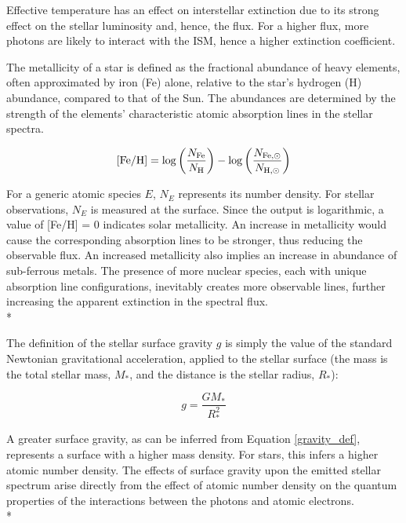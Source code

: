 \documentclass[12pt, a4paper]{report}
\begin{document}
Effective temperature has an effect on interstellar extinction due to its strong effect on the stellar luminosity and, hence, the flux. For a higher flux, more photons are likely to interact with the ISM, hence a higher extinction coefficient.

The metallicity of a star is defined as the fractional abundance of heavy elements, often approximated by iron (Fe) alone, relative to the star's hydrogen (H) abundance, compared to that of the Sun. The abundances are determined by the strength of the elements' characteristic atomic absorption lines in the stellar spectra.

\begin{equation}
\textnormal{[Fe/H]} = \log\left(\frac{N_{\textnormal{Fe}}}{N_{\textnormal{H}}}\right) - \log\left(\frac{N_{\textnormal{Fe},\odot}}{N_{\textnormal{H},\odot}}\right)
\label{FeH_def}
\end{equation}

For a generic atomic species $E$, $N_{E}$ represents its number density. For stellar observations, $N_{E}$ is measured at the surface. Since the output is logarithmic, a value of [Fe/H] = 0 indicates solar metallicity. An increase in metallicity would cause the corresponding absorption lines to be stronger, thus reducing the observable flux. An increased metallicity also implies an increase in abundance of sub-ferrous metals. The presence of more nuclear species, each with unique absorption line configurations, inevitably creates more observable lines, further increasing the apparent extinction in the spectral flux.\\*

The definition of the stellar surface gravity $g$ is simply the value of the standard Newtonian gravitational acceleration, applied to the stellar surface (the mass is the total stellar mass, $M_{*}$, and the distance is the stellar radius, $R_{*}$):

\begin{equation}
g = \frac{GM_{*}}{R_{*}^{2}}
\label{gravity_def}
\end{equation}

A greater surface gravity, as can be inferred from Equation \ref{gravity_def}, represents a surface with a higher mass density. For stars, this infers a higher atomic number density. The effects of surface gravity upon the emitted stellar spectrum arise directly from the effect of atomic number density on the quantum properties of the interactions between the photons and atomic electrons. \\*
\end{document}
